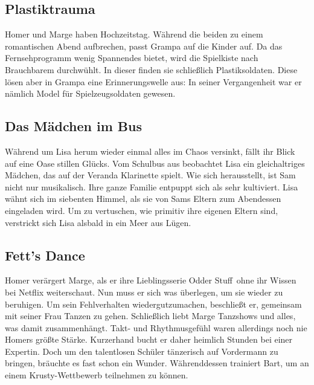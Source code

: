 
\subsection{Plastiktrauma}
Homer und Marge haben Hochzeitstag. Während die beiden zu einem romantischen Abend aufbrechen, passt Grampa auf die Kinder auf. Da das Fernsehprogramm wenig Spannendes bietet, wird die Spielkiste nach Brauchbarem durchwühlt. In dieser finden sie schließlich Plastiksoldaten. Diese lösen aber in Grampa eine Erinnerungswelle aus: In seiner Vergangenheit war er nämlich Model für Spielzeugsoldaten gewesen.


\subsection{Das Mädchen im Bus}
Während um Lisa herum wieder einmal alles im Chaos versinkt, fällt ihr Blick auf eine Oase stillen Glücks. Vom Schulbus aus beobachtet Lisa ein gleichaltriges Mädchen, das auf der Veranda Klarinette spielt. Wie sich herausstellt, ist Sam nicht nur musikalisch. Ihre ganze Familie entpuppt sich als sehr kultiviert. Lisa wähnt sich im siebenten Himmel, als sie von Sams Eltern zum Abendessen eingeladen wird. Um zu vertuschen, wie primitiv ihre eigenen Eltern sind, verstrickt sich Lisa alsbald in ein Meer aus Lügen.

\subsection{Fett's Dance}
Homer verärgert Marge, als er ihre Lieblingsserie \glqq Odder Stuff\grqq\ ohne ihr Wissen bei Netflix weiterschaut. Nun muss er sich was überlegen, um sie wieder zu beruhigen. Um sein Fehlverhalten wiedergutzumachen, beschließt er, gemeinsam mit seiner Frau Tanzen zu gehen. Schließlich liebt Marge Tanzshows und alles, was damit zusammenhängt. Takt- und Rhythmusgefühl waren allerdings noch nie Homers größte Stärke. Kurzerhand bucht er daher heimlich Stunden bei einer Expertin. Doch um den talentlosen Schüler tänzerisch auf Vordermann zu bringen, bräuchte es fast schon ein Wunder. Währenddessen trainiert Bart, um an einem Krusty-Wettbewerb teilnehmen zu können.

